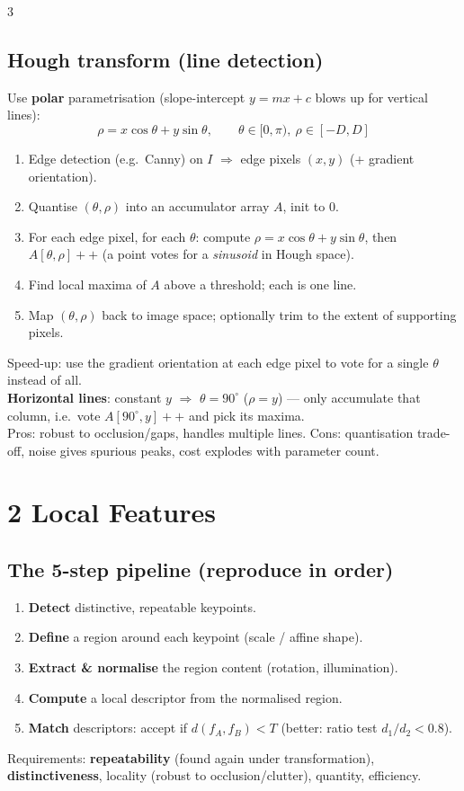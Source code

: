 \documentclass[9pt,a4paper,landscape]{extarticle}
\newcommand{\key}[1]{\textbf{#1}}
\begin{document}
\begin{multicols}{3}
\subsection{Hough transform (line detection)}
Use \key{polar} parametrisation (slope-intercept $y=mx+c$ blows up for vertical lines):
$$\rho = x\cos\theta + y\sin\theta,\qquad \theta\in[0,\pi),\ \rho\in[-D,D]$$
\begin{enumerate}
\item Edge detection (e.g.\ Canny) on $I$ $\Rightarrow$ edge pixels $(x,y)$ (+ gradient orientation).
\item Quantise $(\theta,\rho)$ into an accumulator array $A$, init to $0$.
\item For each edge pixel, for each $\theta$: compute $\rho=x\cos\theta+y\sin\theta$, then $A[\theta,\rho]{+}{+}$ (a point votes for a \emph{sinusoid} in Hough space).
\item Find local maxima of $A$ above a threshold; each is one line.
\item Map $(\theta,\rho)$ back to image space; optionally trim to the extent of supporting pixels.
\end{enumerate}
Speed-up: use the gradient orientation at each edge pixel to vote for a single $\theta$ instead of all.\\
\key{Horizontal lines}: constant $y$ $\Rightarrow$ $\theta=90^{\circ}$ ($\rho=y$) --- only accumulate that column, i.e.\ vote $A[90^\circ,y]{+}{+}$ and pick its maxima.\\
Pros: robust to occlusion/gaps, handles multiple lines. Cons: quantisation trade-off, noise gives spurious peaks, cost explodes with parameter count.

\section{2 \; Local Features}

\subsection{The 5-step pipeline (reproduce in order)}
\begin{enumerate}
\item \key{Detect} distinctive, repeatable keypoints.
\item \key{Define} a region around each keypoint (scale / affine shape).
\item \key{Extract \& normalise} the region content (rotation, illumination).
\item \key{Compute} a local descriptor from the normalised region.
\item \key{Match} descriptors: accept if $d(f_A,f_B)<T$ (better: ratio test $d_1/d_2<0.8$).
\end{enumerate}
Requirements: \key{repeatability} (found again under transformation), \key{distinctiveness}, locality (robust to occlusion/clutter), quantity, efficiency.


\end{multicols}
\end{document}
